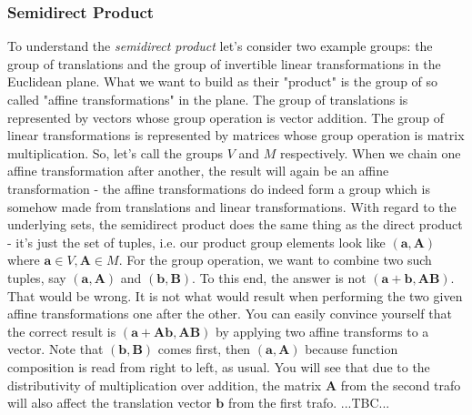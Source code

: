 \subsubsection{Semidirect Product}
To understand the \emph{semidirect product} let's consider two example groups: the group of translations and the group of invertible linear transformations in the Euclidean plane. What we want to build as their "product" is the group of so called "affine transformations" in the plane. The group of translations is represented by vectors whose group operation is vector addition. The group of linear transformations is represented by matrices whose group operation is matrix multiplication. So, let's call the groups $V$ and $M$ respectively. When we chain one affine transformation after another, the result will again be an affine transformation - the affine transformations do indeed form a group which is somehow made from translations and linear transformations. With regard to the underlying sets, the semidirect product does the same thing as the direct product - it's just the set of tuples, i.e. our product group elements look like $(\mathbf{a},\mathbf{A})$ where $\mathbf{a} \in V, \mathbf{A} \in M$. For the group operation, we want to combine two such tuples, say  $(\mathbf{a},\mathbf{A})$ and $(\mathbf{b},\mathbf{B})$. To this end, the answer is not $(\mathbf{a + b},\mathbf{A B})$. That would be wrong. It is not what would result when performing the two given affine transformations one after the other. You can easily convince yourself that the correct result is $(\mathbf{a + A b},\mathbf{A B})$ by applying two affine transforms to a vector. Note that $(\mathbf{b},\mathbf{B})$ comes first, then $(\mathbf{a},\mathbf{A})$ because function composition is read from right to left, as usual. You will see that due to the distributivity of multiplication over addition, the matrix $\mathbf{A}$ from the second trafo will also affect the translation vector $\mathbf{b}$ from the first trafo. ...TBC...





